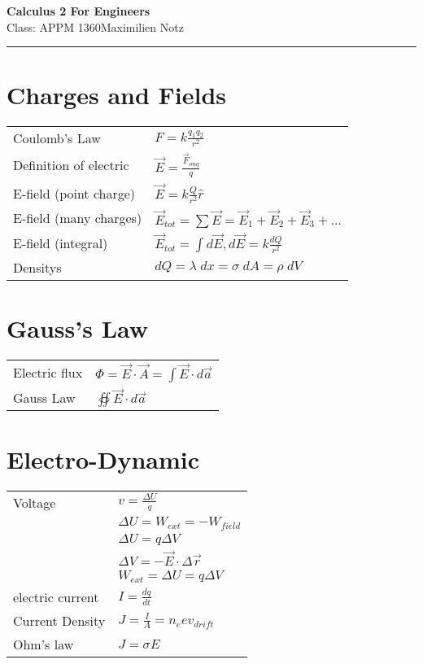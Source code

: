 \documentclass[5pt]{article}
\begin{document}
\begin{center}
     \Large{\textbf{Calculus 2 For Engineers}}\\
     \small{Class: APPM 1360}\hfill\small{\textcopyright Maximilien Notz \the\year{}}
     \noindent\rule{20.2cm}{0.4pt}
\end{center}


\begin{multicols}{2}
\setcounter{secnumdepth}{0}


\section{Charges and Fields}
\begin{tabular}{ll}
    Coulomb's Law & $F=k\frac{q_1q_2}{r^2}$ \\
    Definition of electric & $\vec{E}=\frac{\vec{F}_{on q}}{q}$\\
    E-field \footnotesize{(point charge)} & $\vec{E}=k\frac{Q}{r^2}\hat{r}$\\
    E-field \footnotesize{(many charges)} & $\vec{E}_{tot}=\sum\vec{E}=\vec{E}_1+\vec{E}_2+\vec{E}_3+...$\\ 
    E-field \footnotesize{(integral)} & $\vec{E}_{tot}=\int d\vec{E}, d\vec{E}=k\frac{dQ}{r^2}$\\
    Densitys & $dQ=\lambda\;dx=\sigma\;dA=\rho\;dV$
\end{tabular}

\section{Gauss's Law}
\begin{tabular}{ll}
Electric flux & $\Phi=\vec{E}\cdot\vec{A}=\int\vec{E}\cdot d\vec{a}$\\
Gauss Law & $\oiint\vec{E}\cdot d\vec{a}$
\end{tabular}
\section{Electro-Dynamic}
\begin{tabular}{ll}
Voltage          & $v=\frac{\Delta U}{q}$\\
                 & $\Delta U = W_{ext}=- W_{field}$\\
                 & $\Delta U = q\Delta V$\\
                 & $\Delta V=-\vec{E}\cdot\Delta\vec{r}$\\
                 & $W_{ext}=\Delta U =q\Delta V$\\
electric current & $I=\frac{dq}{dt}$\\
Current Density  & $J=\frac{I}{A}=n_eev_{drift}$\\
Ohm's law        & $J=\sigma E$
\end{tabular}


\end{multicols}
\end{document}
